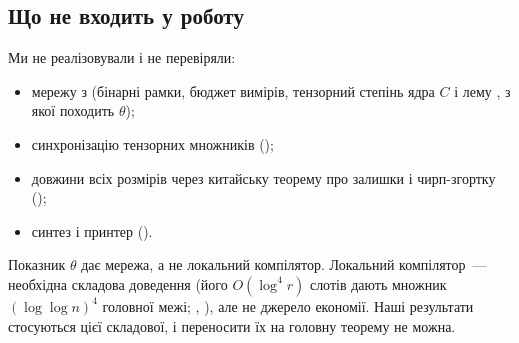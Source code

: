\documentclass[11pt]{article}
\theoremstyle{plain}
\begin{document}
\subsection{Що не входить у роботу}
Ми не реалізовували і не перевіряли:
\begin{itemize}
\item мережу з  (бінарні рамки, бюджет вимірів, тензорний степінь ядра $C$ і лему , з якої походить $\theta$);
\item синхронізацію тензорних множників ();
\item довжини всіх розмірів через китайську теорему про залишки і чирп-згортку ();
\item синтез і принтер ().
\end{itemize}
Показник $\theta$ дає мережа, а не локальний компілятор. Локальний компілятор~--- необхідна складова доведення (його $O(\log^4 r)$ слотів дають множник $(\log\log n)^4$ головної межі; , ), але не джерело економії. Наші результати стосуються цієї складової, і переносити їх на головну теорему не можна.
\end{document}
